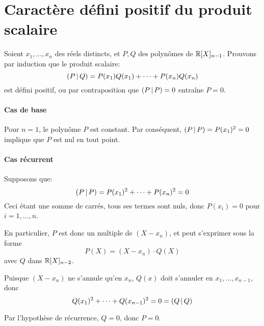 \section{Caractère défini positif du produit scalaire}
\label{sec:math/defini-pos}

Soient $x_1,\ldots,x_n$ des réels distincts,
et $P,Q$ des polynômes de $\mathbb{R}[X]_{n-1}$.
Prouvons par induction que le produit scalaire:
\begin{equation}
    \left(P\,\middle|\,Q\right) = P(x_1)Q(x_1) + \cdots + P(x_n)Q(x_n)
\end{equation}
est défini positif,
ou par contraposition que $\left(P\,\middle|\,P\right)=0$ entraîne $P=0$.

\paragraph{Cas de base}
Pour $n=1$, le polynôme $P$ est constant.
Par conséquent, $\left(P\,\middle|\,P\right) = P(x_1)^2 = 0$
implique que $P$ est nul en tout point.


\paragraph{Cas récurrent}
Supposons que:
\begin{equation}
    \left(P\,\middle|\,P\right) = P(x_1)^2 + \cdots + P(x_n)^2 = 0
\end{equation}
Ceci étant une somme de carrés, tous ses termes sont nuls,
donc $P(x_i) = 0$ pour $i=1,\ldots,n$.

En particulier, $P$ est donc un multiple de $(X-x_n)$,
et peut s'exprimer sous la forme
\begin{equation}
    P(X) = (X-x_n)\cdot Q(X)
\end{equation}
avec $Q$ dans $\mathbb{R}[X]_{n-2}$.

Puisque $(X-x_n)$ ne s'annule qu'en $x_n$,
$Q(x)$ doit s'annuler en $x_1,\ldots,x_{n-1}$,
donc
\begin{equation}
    Q(x_1)^2 + \cdots + Q(x_{n-1})^2 = 0 = \left(Q\,\middle|\,Q\right)
\end{equation}

Par l'hypothèse de récurrence, $Q=0$, donc $P=0$.
